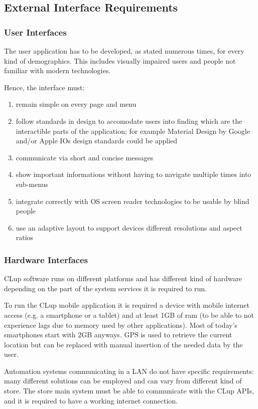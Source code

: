 \subsection{External Interface Requirements}
\subsubsection{User Interfaces}
The user application has to be developed, as stated numerous times, for every kind of demographics.
This includes visually impaired users and people not familiar with modern technologies.

Hence, the interface must:
\begin{enumerate}
    \item remain simple on every page and menu
    \item follow standards in design to accomodate users into finding which are the interactible parts of the application; for example Material Design by Google and/or Apple IOs design standards could be applied
    \item communicate via short and concise messages
    \item show important informations without having to navigate multiple times into sub-menus
    \item integrate correctly with OS screen reader technologies to be usable by blind people
    \item use an adaptive layout to support devices different resolutions and aspect ratios
\end{enumerate}

\subsubsection{Hardware Interfaces}
CLup software runs on different platforms and has different kind of hardware depending on the part of the system services it is required to run.

To run the CLup mobile application it is required a device with mobile internet access (e.g. a smartphone or a tablet) and at least 1GB of ram (to be able to not experience lags due to memory used by other applications). Most of today's smartphones start with 2GB anyways.
GPS is used to retrieve the current location but can be replaced with manual insertion of the needed data by the user.

Automation systems communicating in a LAN do not have specific requirements: many different solutions can be employed and can vary from different kind of store. The store main system must be able to communicate with the CLup APIs, and it is required to have a working internet connection.

